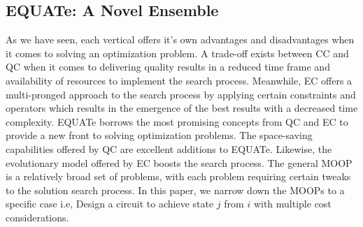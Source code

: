 \documentclass[conference]{IEEEtran}
\begin{document}
\subsection{EQUATe: A Novel Ensemble}
As we have seen, each vertical offers it's own advantages and disadvantages when it comes to solving an optimization problem. A trade-off exists between CC and QC when it comes to delivering quality results in a reduced time frame and availability of resources to implement the search process. Meanwhile, EC offers a multi-pronged approach to the search process by applying certain constraints and operators which results in the emergence of the best results with a decreased time complexity. EQUATe borrows the most promising concepts from QC and EC to provide a new front to solving optimization problems. The space-saving capabilities offered by QC are excellent additions to EQUATe. Likewise, the evolutionary model offered by EC boosts the search process. The general MOOP is a relatively broad set of problems, with each problem requiring certain tweaks to the solution search process. In this paper, we narrow down the MOOPs to a specific case i.e, Design a circuit to achieve state $j$ from $i$ with multiple cost considerations. 
% 
% 
\end{document}

